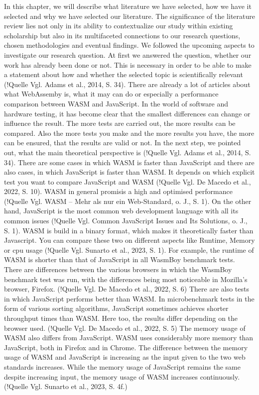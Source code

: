 In this chapter, we will describe what literature we have selected, how we have it selected and why we have selected our literature. 
The significance of the literature review lies not only in its ability to contextualize our study within existing scholarship but also in its multifaceted connections to our research questions, chosen methodologies and eventual findings. We followed the upcoming aspects to investigate our research question.
At first we answered the question, whether our work has already been done or not. This is necessary in order to be able to make a statement about how and whether the selected topic is scientifically relevant (!Quelle Vgl. Adams et al., 2014, S. 34). There are already a lot of articles about what WebAssemby is, what it may can do or especially a performance comparison between WASM and JavaScript. In the world of software and hardware testing, it has become clear that the smallest differences can change or influence the result. The more tests are carried out, the more results can be compared. Also the more tests you make and the more results you have, the more can be ensured, that the results are valid or not.
In the next step, we pointed out, what the main theoretical perspective is (!Quelle Vgl. Adams et al., 2014, S. 34). There are some cases in which WASM is faster than JavaScript and there are also cases, in which JavaScript is faster than WASM. It depends on which explicit test you want to compare JavaScript and WASM (!Quelle Vgl. De Macedo et al., 2022, S. 10). WASM in general promisis a high and optimised performance (!Quelle Vgl. WASM – Mehr als nur ein Web-Standard, o. J., S. 1). On the other hand, JavaScript is the most common web development language with all its common issues (!Quelle Vgl. Common JavaScript Issues and Its Solutions, o. J., S. 1). WASM is build in a binary format, which makes it theoretically faster than Javascript. You can compare these two  on different aspects like Runtime, Memory or cpu usage (!Quelle Vgl. Sunarto et al., 2023, S. 1). For example, the runtime of WASM is shorter than that of JavaScript in all WasmBoy benchmark tests. There are differences between the various browsers in which the WasmBoy benchmark test was run, with the differences being most noticeable in Mozilla's browser, Firefox. (!Quelle Vgl. De Macedo et al., 2022, S. 6) There are also tests in which JavaScript performs better than WASM. In microbenchmark tests in the form of various sorting algorithms, JavaScript sometimes achieves shorter throughput times than WASM. Here too, the results differ depending on the browser used. (!Quelle Vgl. De Macedo et al., 2022, S. 5) The memory usage of WASM also differs from JavaScript. WASM uses considerably more memory than JavaScript, both in Firefox and in Chrome. The difference between the memory usage of WASM and JavaScript is increasing as the input given to the two web standards increases. While the memory usage of JavaScript remains the same despite increasing input, the memory usage of WASM increases continuously. (!Quelle Vgl. Sunarto et al., 2023, S. 4f.)
